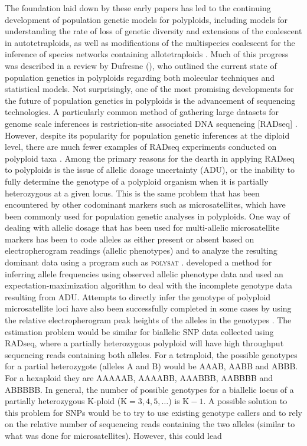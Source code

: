 \documentclass[11pt,english,letterpaper,oneside]{article}
\begin{document}
The foundation laid down by these early papers has led to the continuing development of population genetic models for polyploids, including models for understanding the rate of loss of genetic diversity and extensions of the coalescent in autotetraploids, as well as modifications of the multispecies coalescent for the inference of species networks containing allotetraploids \citep{moody1993autopolyploids,arnold2012autotetraploidCoal,jones2013allopolyploid}. Much of this progress was described in a review by Dufresne \etal{} (\citeyear{dufresne2014polyPopGen}), who outlined the current state of population genetics in polyploids regarding both molecular techniques and statistical models. Not surprisingly, one of the most promising developments for the future of population genetics in polyploids is the advancement of sequencing technologies. A particularly common method of gathering large datasets for genome scale inferences is restriction-site associated DNA sequencing [RADseq] \citep{miller2007gbs,baird2008radTags,puritz2014demystifyingRAD}. However, despite its popularity for population genetic inferences at the diploid level, there are much fewer examples of RADseq experiments conducted on polyploid taxa \citep[but see][]{ogden2013sturgeonRADseq,wang2013birchRADseq,logan-young2015polyploidSNP}. Among the primary reasons for the dearth in applying RADseq to polyploids is the issue of allelic dosage uncertainty (ADU), or the inability to fully determine the genotype of a polyploid organism when it is partially heterozygous at a given locus. This is the same problem that has been encountered by other codominant markers such as microsatellites, which have been commonly used for population genetic analyses in polyploids. One way of dealing with allelic dosage that has been used for multi-allelic microsatellite markers has been to code alleles as either present or absent based on electropherogram readings (allelic phenotypes) and to analyze the resulting dominant data using a program such as \textsc{polysat} \citep{clark2007polysat,dufresne2014polyPopGen}. \cite{deSilva2005alleleFreqs} developed a method for inferring allele frequencies using observed allelic phenotype data and used an expectation-maximization algorithm to deal with the incomplete genotype data resulting from ADU. Attempts to directly infer the genotype of polyploid microsatellite loci have also been successfully completed in some cases by using the relative electropherogram peak heights of the alleles in the genotypes \citep{esselink2004polyploidSSR}. The estimation problem would be similar for biallelic SNP data collected using RADseq, where a partially heterozygous polyploid will have high throughput sequencing reads containing both alleles. For a tetraploid, the possible genotypes for a partial heterozygote (alleles A and B) would be AAAB, AABB and ABBB. For a hexaploid they are AAAAAB, AAAABB, AAABBB, AABBBB and ABBBBB. In general, the number of possible genotypes for a biallelic locus of a partially heterozygous K-ploid ($\text{K}=3,4,5,\ldots$) is $\text{K}-1$. A possible solution to this problem for SNPs would be to try to use existing genotype callers and to rely on the relative number of sequencing reads containing the two alleles (similar to what was done for microsatellites). However, this could lead 
\end{document}
